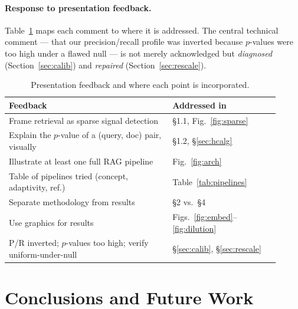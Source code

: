 \documentclass[letterpaper]{article}
\begin{document}
\paragraph{Response to presentation feedback.}
Table~\ref{tab:feedback} maps each comment to where it is addressed.
The central technical comment --- that our precision/recall profile was
inverted because $p$-values were too high under a flawed null --- is not
merely acknowledged but \emph{diagnosed} (Section~\ref{sec:calib}) and
\emph{repaired} (Section~\ref{sec:rescale}).

\begin{table}[t]
\centering
\small
\begin{tabular}{p{0.55\linewidth}p{0.36\linewidth}}
\toprule
\textbf{Feedback} & \textbf{Addressed in} \\
\midrule
Frame retrieval as sparse signal detection & \S1.1, Fig.~\ref{fig:sparse} \\
Explain the $p$-value of a (query, doc) pair, visually & \S1.2, \S\ref{sec:hcalg} \\
Illustrate at least one full RAG pipeline & Fig.~\ref{fig:arch} \\
Table of pipelines tried (concept, adaptivity, ref.) & Table~\ref{tab:pipelines} \\
Separate methodology from results & \S2 vs.\ \S4 \\
Use graphics for results & Figs.~\ref{fig:embed}--\ref{fig:dilution} \\
P/R inverted; $p$-values too high; verify uniform-under-null & \S\ref{sec:calib}, \S\ref{sec:rescale} \\
\bottomrule
\end{tabular}
\caption{Presentation feedback and where each point is incorporated.}
\label{tab:feedback}
\end{table}

\section{Conclusions and Future Work}
\label{sec:future}
\end{document}
